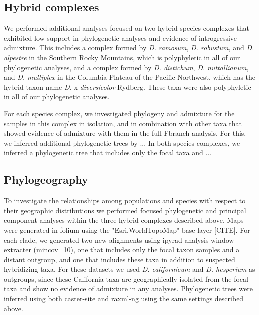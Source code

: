 \documentclass[11pt]{article}
\begin{document}

\subsection{Hybrid complexes}
We performed additional analyses focused on two hybrid species complexes that
exhibited low support in phylogenetic analyses and evidence of introgressive
admixture.
% 
This includes a complex formed by \emph{D. ramosum}, \emph{D. robustum}, and \emph{D. alpestre} 
in the Southern Rocky Mountains, which is polyphyletic in all of our phylogenetic analyses, 
and a complex formed by \emph{D. distichum}, \emph{D. nuttallianum}, and \emph{D. multiplex} in 
the Columbia Plateau of the Pacific Northwest, which has the hybrid taxon name 
\emph{D.} x \emph{diversicolor} Rydberg. 
These taxa were also polyphyletic in all of our phylogenetic analyses.


For each species complex, we investigated phylogeny and admixture for the samples in this
complex in isolation, and in combination with other taxa that showed evidence of admixture
with them in the full Fbranch analysis. 
For this, we inferred additional phylogenetic trees by 
...
In both species complexes, we inferred a phylogenetic tree that includes only the focal taxa and 
...


\subsection{Phylogeography}
To investigate the relationships among populations and species with respect
to their geographic distributions we performed focused phylogenetic and principal
component analyses within the three hybrid complexes described above. 
Maps were generated in folium using the "Esri.WorldTopoMap" base layer [CITE].
For each clade, we generated two new alignments using ipyrad-analysis window extracter 
(mincov=10), one that includes only the focal taxon samples and a distant outgroup, 
and one that includes these taxa in addition to suspected hybridizing taxa.
For these datasets we used \emph{D. californicum} and \emph{D. hesperium} as outgroups, 
since these California taxa are geographically isolated from the focal taxa and show no evidence of admixture
in any analyses. Phylogenetic trees were inferred using both caster-site and raxml-ng using the same settings described above.
\end{document}
